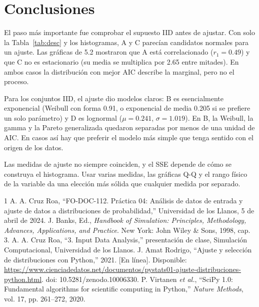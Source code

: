 \documentclass[conference]{IEEEtran}
\begin{document}
\section{Conclusiones}
El paso más importante fue comprobar el supuesto IID antes de ajustar. Con solo la Tabla~\ref{tab:desc} y los histogramas, A y C parecían candidatos normales para un ajuste. Las gráficas de 5.2 mostraron que A está correlacionado ($r_1=0.49$) y que C no es estacionario (su media se multiplica por 2.65 entre mitades). En ambos casos la distribución con mejor AIC describe la marginal, pero no el proceso.

Para los conjuntos IID, el ajuste dio modelos claros: B es esencialmente exponencial (Weibull con forma 0.91, o exponencial de media 0.205 si se prefiere un solo parámetro) y D es lognormal ($\mu=0.241$, $\sigma=1.019$). En B, la Weibull, la gamma y la Pareto generalizada quedaron separadas por menos de una unidad de AIC. En casos así hay que preferir el modelo más simple que tenga sentido con el origen de los datos.

Las medidas de ajuste no siempre coinciden, y el SSE depende de cómo se construya el histograma. Usar varias medidas, las gráficas Q-Q y el rango físico de la variable da una elección más sólida que cualquier medida por separado.

\balance
\begin{thebibliography}{1}
 A. A. Cruz Roa, ``FO-DOC-112. Práctica 04: Análisis de datos de entrada y ajuste de datos a distribuciones de probabilidad,'' Universidad de los Llanos, 5 de abril de 2024.
 J. Banks, Ed., \emph{Handbook of Simulation: Principles, Methodology, Advances, Applications, and Practice}. New York: John Wiley \& Sons, 1998, cap. 3.
 A. A. Cruz Roa, ``3. Input Data Analysis,'' presentación de clase, Simulación Computacional, Universidad de los Llanos.
 J. Amat Rodrigo, ``Ajuste y selección de distribuciones con Python,'' 2021. [En línea]. Disponible: \url{https://www.cienciadedatos.net/documentos/pystats01-ajuste-distribuciones-python.html}. doi: 10.5281/zenodo.10006330.
 P. Virtanen \emph{et al.}, ``SciPy 1.0: Fundamental algorithms for scientific computing in Python,'' \emph{Nature Methods}, vol. 17, pp. 261--272, 2020.
\end{thebibliography}
\end{document}
